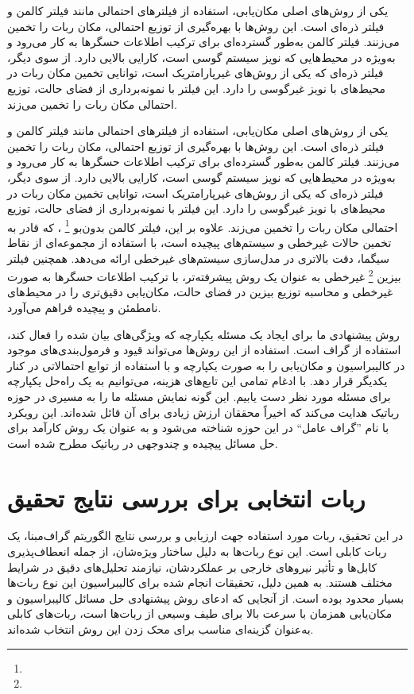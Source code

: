 یکی از روش‌های اصلی مکان‌یابی، استفاده از فیلترهای احتمالی مانند فیلتر کالمن و فیلتر ذره‌ای است. این روش‌ها با بهره‌گیری از توزیع احتمالی، مکان ربات را تخمین می‌زنند. فیلتر کالمن به‌طور گسترده‌ای برای ترکیب اطلاعات حسگرها به کار می‌رود و به‌ویژه در محیط‌هایی که نویز سیستم گوسی است، کارایی بالایی دارد. از سوی دیگر، فیلتر ذره‌ای که یکی از روش‌های غیرپارامتریک است، توانایی تخمین مکان ربات در محیط‌های با نویز غیرگوسی را دارد. این فیلتر با نمونه‌برداری از فضای حالت، توزیع احتمالی مکان ربات را تخمین می‌زند.

یکی از روش‌های اصلی مکان‌یابی، استفاده از فیلترهای احتمالی مانند فیلتر کالمن و فیلتر ذره‌ای است. این روش‌ها با بهره‌گیری از توزیع احتمالی، مکان ربات را تخمین می‌زنند. فیلتر کالمن به‌طور گسترده‌ای برای ترکیب اطلاعات حسگرها به کار می‌رود و به‌ویژه در محیط‌هایی که نویز سیستم گوسی است، کارایی بالایی دارد. از سوی دیگر، فیلتر ذره‌ای که یکی از روش‌های غیرپارامتریک است، توانایی تخمین مکان ربات در محیط‌های با نویز غیرگوسی را دارد. این فیلتر با نمونه‌برداری از فضای حالت، توزیع احتمالی مکان ربات را تخمین می‌زند. علاوه بر این، فیلتر کالمن بدون‌بو
\footnote{}
، که قادر به تخمین حالات غیرخطی و سیستم‌های پیچیده است، با استفاده از مجموعه‌ای از نقاط سیگما، دقت بالاتری در مدل‌سازی سیستم‌های غیرخطی ارائه می‌دهد. همچنین فیلتر بیزین
\footnote{}
 غیرخطی به عنوان یک روش پیشرفته‌تر، با ترکیب اطلاعات حسگرها به صورت غیرخطی و محاسبه توزیع بیزین در فضای حالت، مکان‌یابی دقیق‌تری را در محیط‌های نامطمئن و پیچیده فراهم می‌آورد.

روش پیشنهادی ما برای ایجاد یک مسئله یکپارچه که ویژگی‌های بیان شده را فعال کند، استفاده از گراف است. استفاده از این روش‌ها می‌تواند قیود و فرمول‌بندی‌های موجود در کالیبراسیون و مکان‌یابی را به صورت یکپارچه و با استفاده از توابع احتمالاتی در کنار یکدیگر قرار دهد. با ادغام تمامی این تابع‌های هزینه، می‌توانیم به یک راه‌حل یکپارچه برای مسئله مورد نظر دست یابیم. این گونه نمایش‌ مسئله ما را به مسیری در حوزه رباتیک هدایت می‌کند که اخیراً محققان ارزش زیادی برای آن قائل شده‌اند. این رویکرد با نام ”گراف عامل“ در این حوزه شناخته می‌شود و به عنوان یک روش کارآمد برای حل مسائل پیچیده و چندوجهی در رباتیک مطرح شده است. 

\section{ربات انتخابی برای بررسی نتایج تحقیق}

در این تحقیق، ربات مورد استفاده جهت ارزیابی و بررسی نتایج الگوریتم گراف‌مبنا، یک ربات کابلی است. این نوع ربات‌ها به دلیل ساختار ویژه‌شان، از جمله انعطاف‌پذیری کابل‌ها و تأثیر نیروهای خارجی بر عملکردشان، نیازمند تحلیل‌های دقیق در شرایط مختلف هستند. به همین دلیل، تحقیقات انجام شده برای کالیبراسیون این نوع ربات‌ها بسیار محدود بوده است. از آنجایی که ادعای روش پیشنهادی حل مسائل کالیبراسیون و مکان‌یابی همزمان با سرعت بالا برای طیف وسیعی از ربات‌ها است، ربات‌های کابلی به‌عنوان گزینه‌ای مناسب برای محک زدن این روش انتخاب شده‌اند.

